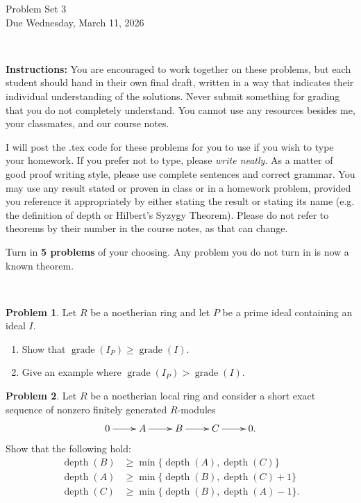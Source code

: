 \documentclass[11pt]{article}
\title{}
\date{\vspace{-0.5in}}
\DeclareMathOperator{\depth}{depth}
\DeclareMathOperator{\grade}{grade}
\theoremstyle{definition}
\newtheorem{problem}{Problem}
\begin{document}
\thispagestyle{fancy}
\pagestyle{fancy}

\vspace{3em}

\begin{center}
	{\LARGE Problem Set 3 \\}
	Due Wednesday, March 11, 2026
\end{center}

\

\noindent
{\bf Instructions:}
You are encouraged to work together on these problems, but each student should hand in their own final draft, written in a way that indicates their individual understanding of the solutions. Never submit something for grading that you do not completely understand. You cannot use any resources besides me, your classmates, and our course notes.


I will post the .tex code for these problems for you to use if you wish to type your homework. If you prefer not to type, please {\em write neatly}. As a matter of good proof writing style, please use complete sentences and correct grammar. You may use any result  stated or proven in class or in a homework problem, provided you reference it appropriately by either stating the result or stating its name (e.g. the definition of depth or Hilbert's Syzygy Theorem). Please do not refer to theorems by their number in the course notes, as that can change.


\vspace{2em}


\noindent
Turn in {\bf 5 problems} of your choosing. Any problem you do not turn in is now a known theorem.

\



\begin{problem}
	Let $R$ be a noetherian ring and let $P$ be a prime ideal containing an ideal $I$.
	
	\begin{enumerate}[label=\alph*), itemsep=-0.1em]
		\item Show that $\grade(I_P) \geqslant \grade(I)$.
		\item Give an example where $\grade(I_P) > \grade(I)$.
	\end{enumerate}
\end{problem}

\vfill

\begin{problem}
		Let $R$ be a noetherian local ring and consider a short exact sequence of nonzero finitely generated $R$-modules
	\[ \xymatrix{
 0 \arrow[r] & A \arrow[r] & B \arrow[r] & C \arrow[r] & 0.}
\]
Show that the following hold:
\[\begin{aligned}
 \depth(B) & \geqslant \min \lbrace \depth(A), \depth(C) \rbrace\\
 \depth(A) & \geqslant \min \lbrace \depth(B), \depth(C)+1 \rbrace\\
 \depth(C) & \geqslant	\min \lbrace \depth(B), \depth(A)-1 \rbrace.
 \end{aligned}\]
\end{problem}
\end{document}
